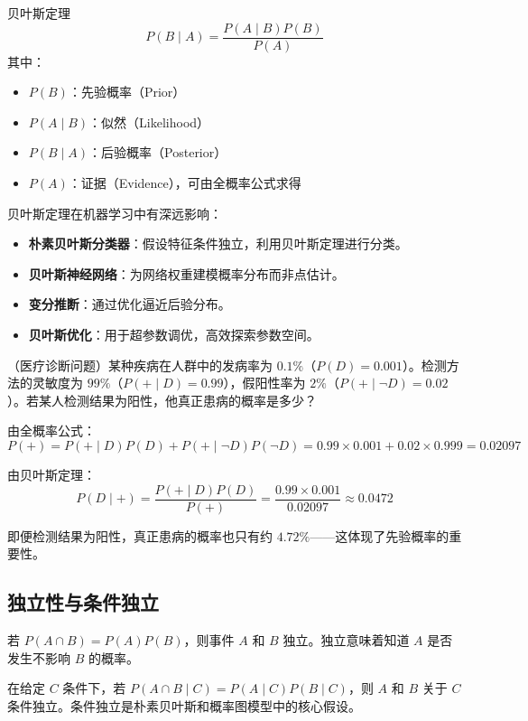 \begin{myTheorem}{贝叶斯定理}
\[
P(B\mid A) = \frac{P(A\mid B)P(B)}{P(A)}
\]
其中：
\begin{itemize}
    \item $P(B)$：先验概率（Prior）
    \item $P(A\mid B)$：似然（Likelihood）
    \item $P(B\mid A)$：后验概率（Posterior）
    \item $P(A)$：证据（Evidence），可由全概率公式求得
\end{itemize}
\end{myTheorem}

贝叶斯定理在机器学习中有深远影响：
\begin{itemize}
    \item \textbf{朴素贝叶斯分类器}：假设特征条件独立，利用贝叶斯定理进行分类。
    \item \textbf{贝叶斯神经网络}：为网络权重建模概率分布而非点估计。
    \item \textbf{变分推断}：通过优化逼近后验分布。
    \item \textbf{贝叶斯优化}：用于超参数调优，高效探索参数空间。
\end{itemize}

\begin{example}
（医疗诊断问题）某种疾病在人群中的发病率为 $0.1\%$（$P(D)=0.001$）。检测方法的灵敏度为 $99\%$（$P(+\mid D)=0.99$），假阳性率为 $2\%$（$P(+\mid \neg D)=0.02$）。若某人检测结果为阳性，他真正患病的概率是多少？

由全概率公式：
\[
P(+) = P(+\mid D)P(D) + P(+\mid \neg D)P(\neg D) = 0.99\times 0.001 + 0.02\times 0.999 = 0.02097
\]

由贝叶斯定理：
\[
P(D\mid +) = \frac{P(+\mid D)P(D)}{P(+)} = \frac{0.99\times 0.001}{0.02097} \approx 0.0472
\]

即便检测结果为阳性，真正患病的概率也只有约 $4.72\%$——这体现了先验概率的重要性。
\end{example}

\subsection{独立性与条件独立}

若 $P(A\cap B)=P(A)P(B)$，则事件 $A$ 和 $B$ 独立。独立意味着知道 $A$ 是否发生不影响 $B$ 的概率。

在给定 $C$ 条件下，若 $P(A\cap B\mid C)=P(A\mid C)P(B\mid C)$，则 $A$ 和 $B$ 关于 $C$ 条件独立。条件独立是朴素贝叶斯和概率图模型中的核心假设。


